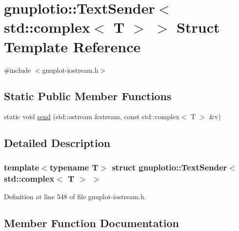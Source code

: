 \hypertarget{structgnuplotio_1_1_text_sender_3_01std_1_1complex_3_01_t_01_4_01_4}{}\section{gnuplotio\+:\+:Text\+Sender$<$ std\+:\+:complex$<$ T $>$ $>$ Struct Template Reference}
\label{structgnuplotio_1_1_text_sender_3_01std_1_1complex_3_01_t_01_4_01_4}


{\ttfamily \#include $<$gnuplot-\/iostream.\+h$>$}

\subsection*{Static Public Member Functions}
\begin{DoxyCompactItemize}
\item 
static void \hyperlink{structgnuplotio_1_1_text_sender_3_01std_1_1complex_3_01_t_01_4_01_4_ad524aa3e121d0ebd66346d77f1fd5a1c}{send} (std\+::ostream \&stream, const std\+::complex$<$ T $>$ \&v)
\end{DoxyCompactItemize}


\subsection{Detailed Description}
\subsubsection*{template$<$typename T$>$\newline
struct gnuplotio\+::\+Text\+Sender$<$ std\+::complex$<$ T $>$ $>$}



Definition at line 548 of file gnuplot-\/iostream.\+h.



\subsection{Member Function Documentation}
\mbox{\label{structgnuplotio_1_1_text_sender_3_01std_1_1complex_3_01_t_01_4_01_4_ad524aa3e121d0ebd66346d77f1fd5a1c}} 
